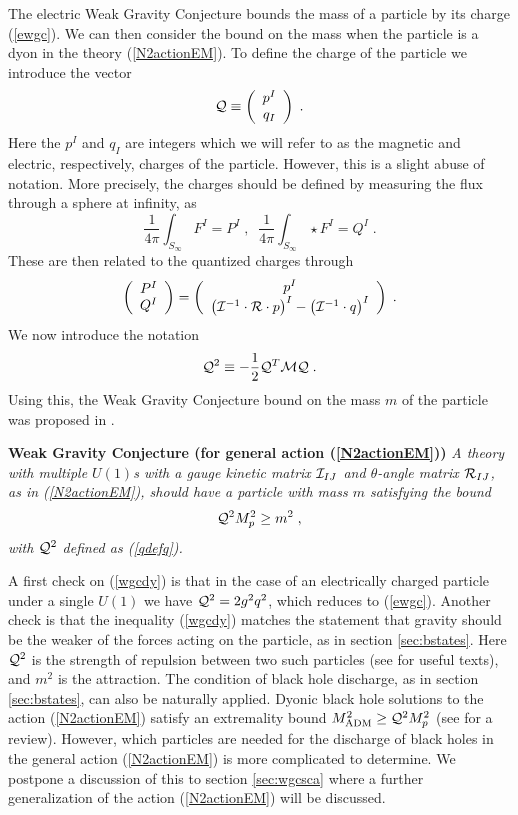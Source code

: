 \documentclass[11pt,a4paper]{article}
\numberwithin{equation}{section}
\numberwithin{table}{section}\setlength{\multlinegap}{25pt}
\newcommand{\be}{\begin{equation}}
\newcommand{\ee}{\end{equation}}
\begin{document}
The electric Weak Gravity Conjecture bounds the mass of a particle by its charge (\ref{ewgc}). We can then consider the bound on the mass when the particle is a dyon in the theory (\ref{N2actionEM}). To define the charge of the particle we introduce the vector
\be
\label{Qdef}
{\cal Q} \equiv \left( \begin{array}{c} p^I \\ q_I \end{array} \right) \;.
\ee
Here the $p^I$ and $q_I$ are integers which we will refer to as the magnetic and electric, respectively, charges of the particle. However, this is a slight abuse of notation. More precisely, the charges should be defined by measuring the flux through a sphere at infinity, as
\be
\frac{1}{4\pi} \int_{S_{\infty}} F^I =  P^I \;,\;\; \frac{1}{4\pi} \int_{S_{\infty}} \star F^I = Q^I \;.
\ee
These are then related to the quantized charges through
 \be
\left( \begin{array}{c} P^I \\ Q^I \end{array} \right)  =  \left( \begin{array}{c} p^I \\ \left( {\cal I}^{-1} \cdot {\cal R} \cdot p \right)^I - \left({\cal I}^{-1}\cdot q \right)^I \end{array} \right) \;.
\ee
We now introduce the notation 
\be
{\cal Q}^2 \equiv -\frac12 {\cal Q}^T {\cal M} {\cal Q} \;. \label{qdefq}
\ee
Using this, the Weak Gravity Conjecture bound on the mass $m$ of the particle was proposed in \cite{Palti:2017elp}.
\begin{tcolorbox}
{\bf Weak Gravity Conjecture (for general action (\ref{N2actionEM}))} \;\cite{Palti:2017elp}
{\it 
\newline
\newline
A theory with multiple $U(1)$s with a gauge kinetic matrix ${\cal I}_{IJ}$ and $\theta$-angle matrix ${\cal R}_{IJ}$, as in (\ref{N2actionEM}), should have a particle with mass $m$ satisfying the bound
\be
\label{wgcdy}
 {\cal Q}^2 M_p^2 \geq m^2 \;,
\ee 
with ${\cal Q}^2$ defined as (\ref{qdefq}).
}
\end{tcolorbox}

A first check on (\ref{wgcdy}) is that in the case of an electrically charged particle under a single $U(1)$ we have ${\cal Q}^2 = 2 g^2 q^2$, which reduces to (\ref{ewgc}). Another check is that the inequality (\ref{wgcdy}) matches the statement that gravity should be the weaker of the forces acting on the particle, as in section \ref{sec:bstates}. Here ${\cal Q}^2$ is the strength of repulsion between two such particles (see \cite{Ritz:2001jk,Andrianopoli:2006ub} for useful texts), and $m^2$ is the attraction. The condition of black hole discharge, as in section \ref{sec:bstates}, can also be naturally applied. Dyonic black hole solutions to the action (\ref{N2actionEM}) satisfy an extremality bound $M^2_{\mathrm{ADM}} \geq {\cal Q}^2 M_p^2$ (see \cite{DallAgata:2011zkh} for a review). However, which particles are needed for the discharge of black holes in the general action (\ref{N2actionEM}) is more complicated to determine. We postpone a discussion of this to section \ref{sec:wgcsca} where a further generalization of the action (\ref{N2actionEM}) will be discussed.
\end{document}
